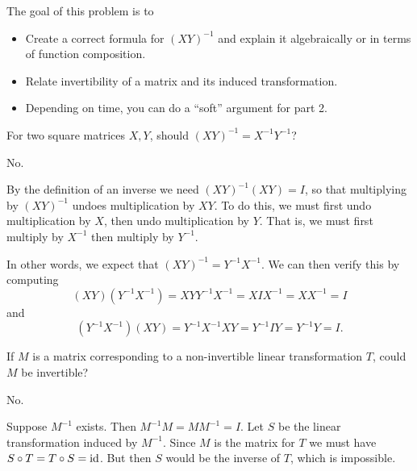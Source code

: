 	\bookonlynewpage
	\question
	\begin{annotation}
		\begin{goals}

			The goal of this problem is to
			\begin{itemize}
				\item Create a correct formula for $(XY)^{-1}$ and
					explain it algebraically or in terms of 
					function composition.
				\item Relate invertibility of a matrix and its induced transformation.
			\end{itemize}
		\end{goals}

		\begin{notes}
			\begin{itemize}
				\item Depending on time, you can do a ``soft'' argument for part 2.
			\end{itemize}
		\end{notes}
	\end{annotation}
	\begin{parts}
		\item For two square matrices $X,Y$, should $(XY)^{-1}=X^{-1}Y^{-1}$?
			\begin{solution}
				No.

				By the definition of an inverse we need $(XY)^{-1}(XY)=I$, so
				that multiplying by $(XY)^{-1}$ undoes multiplication
				by $XY$. To do this, we must first undo multiplication by $X$,
				then undo multiplication by $Y$. That is, we must first multiply
				by $X^{-1}$ then multiply by $Y^{-1}$.

				In other words, we expect that $(XY)^{-1} = Y^{-1}X^{-1}$. We can
				then verify this by computing
				\[
					(XY)(Y^{-1}X^{-1}) = XYY^{-1}X^{-1} = XIX^{-1} = XX^{-1} = I
				\]
				and
				\[
					(Y^{-1}X^{-1})(XY) = Y^{-1}X^{-1}XY = Y^{-1}IY = Y^{-1}Y = I.
				\]
			\end{solution}
		\item If $M$ is a matrix corresponding to a non-invertible linear transformation $T$,
			could $M$ be invertible?
			\begin{solution}
				No.

				Suppose $M^{-1}$ exists. Then $M^{-1}M=MM^{-1}=I$.
				Let $S$ be the linear transformation induced by $M^{-1}$.
				Since $M$ is the matrix for $T$ we must have $S\circ T=T\circ S=\operatorname{id}$. But
				then $S$ would be the inverse of $T$, which is impossible.
			\end{solution}
	\end{parts}

